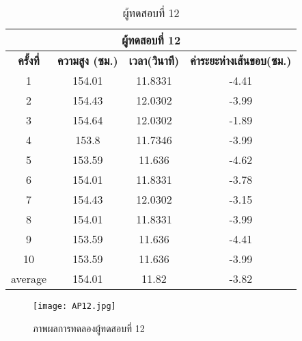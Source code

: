 \begin{table}[!hb] 
\centering
\caption{ผู้ทดสอบที่ 12}
\label{tab:12}
\begin{tabular}{|c|c|c|c|}
\hline
\multicolumn{4}{|c|}{\textbf{ผู้ทดสอบที่ 12}}    \\ \hline
\textbf{ครั้งที่} & \textbf{ความสูง (ซม.)} & \textbf{เวลา(วินาที)} & \textbf{ค่าระยะห่างเส้นขอบ(ซม.)} \\ \hline
1       & 154.01 & 11.8331 & -4.41    \\ \hline
2       & 154.43 & 12.0302 & -3.99     \\ \hline
3       & 154.64 & 12.0302 & -1.89    \\ \hline
4       & 153.8  & 11.7346 & -3.99      \\ \hline
5       & 153.59 & 11.636  & -4.62    \\ \hline
6       & 154.01 & 11.8331 & -3.78    \\ \hline
7       & 154.43 & 12.0302 & -3.15    \\ \hline
8       & 154.01 & 11.8331 & -3.99      \\ \hline
9       & 153.59 & 11.636  & -4.41   \\ \hline
10      & 153.59 & 11.636  & -3.99   \\ \hline
average & 154.01 & 11.82   & -3.82  \\ \hline
\end{tabular}
\end{table}
\begin{figure}[!ht]
\centering
\texttt{[image: AP12.jpg]}
\caption{ภาพผลการทดลองผู้ทดสอบที่ 12 }
\label{fig:AP12.jpg}
\end{figure}
\clearpage


